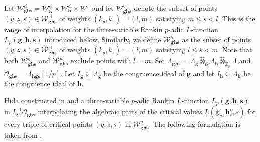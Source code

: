 \documentclass[a4paper,11pt]{amsart}
\theoremstyle{plain}
\theoremstyle{definition}
\newtheorem{defi}[theorem]{Definition}
\theoremstyle{remark}
\newcommand{\bb}{\mathbb}
\newcommand{\cl}{\mathcal}
\DeclareMathOperator{\Spf}{Spf}
\newcommand{\hg}{{\mathbf{g}}}
\newcommand{\hh}{{\mathbf h}}
\numberwithin{equation}{section}
\begin{document}
Let $\cl{W}_{\hg \hh \mathbf{s}}^{\mathrm{cl}}=\cl{W}_{\hg}^{\mathrm{cl}}\times \cl{W}_{\hh}^{\mathrm{cl}}\times \cl{W}^\circ$ and let $\cl{W}_{\hg \hh \mathbf{s}}^{g}$ denote the subset of points $(y,z,s)\in \cl{W}_{\hg \hh \mathbf{s}}^{\mathrm{cl}}$ of weights $(k_y,k_z)=(l,m)$ satisfying $m\leq s<l$. This is the range of interpolation for the three-variable Rankin $p$-adic $L$-function $L_p(\hg,\hh,\mathbf{s})$ introduced below. Similarly, we define $\cl{W}_{\hg\hh\mathbf{s}}^h$ as the subset of points $(y,z,s)\in \cl{W}_{\hg \hh \mathbf{s}}^{\mathrm{cl}}$ of weights $(k_y,k_z)=(l,m)$ satisfying $l\leq s<m$. Note that both $\cl{W}_{\hg\hh\mathbf{s}}^g$ and $\cl{W}_{\hg\hh\mathbf{s}}^h$ exclude points with $l=m$. Set $\Lambda_{\hg \hh \mathbf{s}}=\Lambda_{\hg}\hat{\otimes}_{\cl{O}} \Lambda_{\hh}\hat{\otimes}_{\bb{Z}_p} \Lambda$ and $\cl{O}_{\hg \hh \mathbf{s}}=\Lambda_{\mathbf{hgs}}[1/p]$. Let $I_\hg\subseteq \Lambda_\hg$ be the congruence ideal of $\hg$ and let $I_{\hh}\subseteq \Lambda_{\hh}$ be the congruence ideal of $\hh$.




 Hida constructed in \cite{hida1} and \cite{hida2} a three-variable $p$-adic Rankin $L$-function $L_p(\hg, \hh, \mathbf{s})$ in $I_{\hg}^{-1} \cl{O}_{\mathbf{ghs}}$ interpolating the algebraic parts of the critical values $L(\hg^\circ_y,\hh^\circ_z,s)$ for every triple of critical points $(y,z,s)$ in $\mathcal W_{\hg \hh \mathbf{s}}^{g}$. The following formulation is taken from \cite[Thm.~7.7.2]{KLZ}. %
\end{document}
